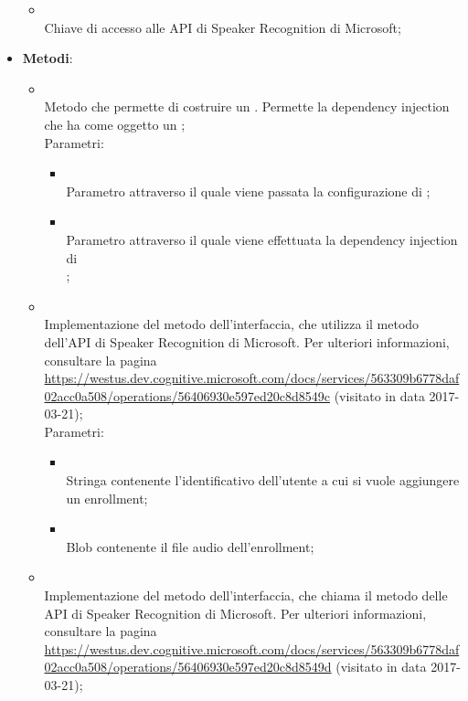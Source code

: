 \begin{itemize}
\begin{itemize}
		\item[]  \\
		Chiave di accesso alle API di Speaker Recognition di Microsoft;
	\end{itemize}
	\item \textbf{Metodi}:
	\begin{itemize}
		\item[]  \\		Metodo che permette di costruire un . Permette la dependency injection che ha come oggetto un ;\\
		Parametri:
		\begin{itemize}
			\item {} \\
			Parametro attraverso il quale viene passata la configurazione di ;
			\item {} \\
			Parametro attraverso il quale viene effettuata la dependency injection di \\  ;
		\end{itemize}
		\item[]  \\		Implementazione del metodo dell'interfaccia, che utilizza il metodo  dell'API di Speaker Recognition di Microsoft. Per ulteriori informazioni, consultare la pagina \url{https://westus.dev.cognitive.microsoft.com/docs/services/563309b6778daf02acc0a508/operations/56406930e597ed20c8d8549c} (visitato in data 2017-03-21);\\
		Parametri:
		\begin{itemize}
			\item {} \\
			Stringa contenente l'identificativo dell'utente a cui si vuole aggiungere un enrollment;
			\item {} \\
			Blob contenente il file audio dell'enrollment;
		\end{itemize}
		\item[]  \\		Implementazione del metodo dell'interfaccia, che chiama il metodo  delle API di Speaker Recognition di Microsoft. Per ulteriori informazioni, consultare la pagina \url{https://westus.dev.cognitive.microsoft.com/docs/services/563309b6778daf02acc0a508/operations/56406930e597ed20c8d8549d}  (visitato in data 2017-03-21);\\

\end{itemize}
\end{itemize}
